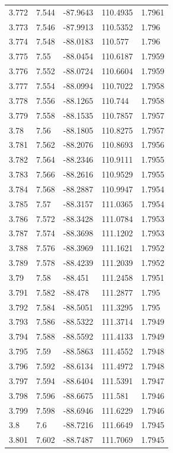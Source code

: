 \begin{tabular}{lllll}
3.772 & 7.544 & -87.9643 & 110.4935 & 1.7961 \\
3.773 & 7.546 & -87.9913 & 110.5352 & 1.796 \\
3.774 & 7.548 & -88.0183 & 110.577 & 1.796 \\
3.775 & 7.55 & -88.0454 & 110.6187 & 1.7959 \\
3.776 & 7.552 & -88.0724 & 110.6604 & 1.7959 \\
3.777 & 7.554 & -88.0994 & 110.7022 & 1.7958 \\
3.778 & 7.556 & -88.1265 & 110.744 & 1.7958 \\
3.779 & 7.558 & -88.1535 & 110.7857 & 1.7957 \\
3.78 & 7.56 & -88.1805 & 110.8275 & 1.7957 \\
3.781 & 7.562 & -88.2076 & 110.8693 & 1.7956 \\
3.782 & 7.564 & -88.2346 & 110.9111 & 1.7955 \\
3.783 & 7.566 & -88.2616 & 110.9529 & 1.7955 \\
3.784 & 7.568 & -88.2887 & 110.9947 & 1.7954 \\
3.785 & 7.57 & -88.3157 & 111.0365 & 1.7954 \\
3.786 & 7.572 & -88.3428 & 111.0784 & 1.7953 \\
3.787 & 7.574 & -88.3698 & 111.1202 & 1.7953 \\
3.788 & 7.576 & -88.3969 & 111.1621 & 1.7952 \\
3.789 & 7.578 & -88.4239 & 111.2039 & 1.7952 \\
3.79 & 7.58 & -88.451 & 111.2458 & 1.7951 \\
3.791 & 7.582 & -88.478 & 111.2877 & 1.795 \\
3.792 & 7.584 & -88.5051 & 111.3295 & 1.795 \\
3.793 & 7.586 & -88.5322 & 111.3714 & 1.7949 \\
3.794 & 7.588 & -88.5592 & 111.4133 & 1.7949 \\
3.795 & 7.59 & -88.5863 & 111.4552 & 1.7948 \\
3.796 & 7.592 & -88.6134 & 111.4972 & 1.7948 \\
3.797 & 7.594 & -88.6404 & 111.5391 & 1.7947 \\
3.798 & 7.596 & -88.6675 & 111.581 & 1.7946 \\
3.799 & 7.598 & -88.6946 & 111.6229 & 1.7946 \\
3.8 & 7.6 & -88.7216 & 111.6649 & 1.7945 \\
3.801 & 7.602 & -88.7487 & 111.7069 & 1.7945 \\

\end{tabular}
